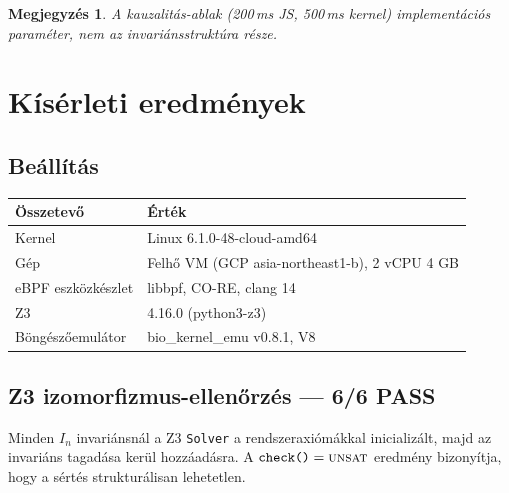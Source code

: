 \documentclass[11pt,a4paper,twoside]{article}
\newtheorem*{megjegyzes}{Megjegyzés}
\begin{document}
\begin{megjegyzes}
A kauzalitás-ablak (200\,ms JS, 500\,ms kernel) implementációs paraméter,
nem az invariánsstruktúra része.
\end{megjegyzes}

\section{Kísérleti eredmények}

\subsection{Beállítás}

\begin{table}[H]
\centering
\begin{tabular}{@{}ll@{}}
\toprule
\textbf{Összetevő} & \textbf{Érték} \\ \midrule
Kernel             & Linux 6.1.0-48-cloud-amd64 \\
Gép                & Felhő VM (GCP asia-northeast1-b), 2 vCPU 4 GB \\
eBPF eszközkészlet & libbpf, CO-RE, clang 14 \\
Z3                 & 4.16.0 (python3-z3) \\
Böngészőemulátor   & bio\_kernel\_emu v0.8.1, V8 \\
\bottomrule
\end{tabular}
\end{table}

\subsection{Z3 izomorfizmus-ellenőrzés --- 6/6 PASS}

Minden $I_n$ invariánsnál a Z3 \texttt{Solver} a rendszeraxiómákkal inicializált,
majd az invariáns tagadása kerül hozzáadásra. A $\texttt{check()} = \textsc{unsat}$
eredmény bizonyítja, hogy a sértés strukturálisan lehetetlen.
\end{document}
